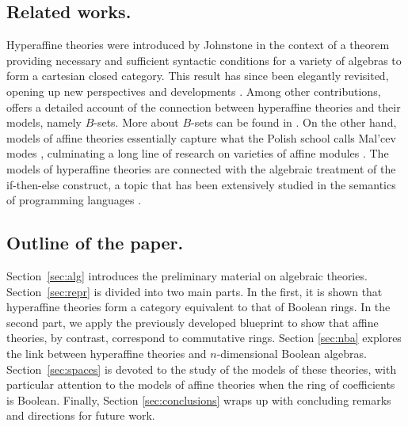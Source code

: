 \documentclass{amsart}
\numberwithin{equation}{section}
\theoremstyle{plain}
\theoremstyle{definition}
\begin{document}
\subsection{Related works.}
Hyperaffine theories were introduced by Johnstone \cite{J90} in the context of a theorem providing necessary and sufficient syntactic conditions for a variety of algebras to form a cartesian closed category.
This result has since been elegantly revisited, opening up new perspectives and developments \cite{G24,G25}.
Among other contributions, \cite{G24} offers a detailed account of the connection between hyperaffine theories and their models, namely $B$-sets.
More about $B$-sets can be found in \cite{S98a,S98b}.
On the other hand, models of affine theories essentially capture what the Polish school calls Mal'cev modes \cite{RS02},
culminating a long line of research on varieties of affine modules \cite{SO66,C75,S77,PRS95}.
The models of hyperaffine theories are connected with the algebraic treatment of the if-then-else construct, a topic that has been extensively studied in the semantics of programming languages \cite{M90,M92,M93,JS09}. 

\subsection{Outline of the paper.}
Section~\ref{sec:alg} introduces the preliminary material on algebraic theories.
Section~\ref{sec:repr} is divided into two main parts.
In the first, it is shown that hyperaffine theories form a category equivalent to that of Boolean rings.
In the second part, we apply the previously developed blueprint to show that affine theories, by contrast, correspond to commutative rings.
Section \ref{sec:nba} explores the link between hyperaffine theories and $n$-dimensional Boolean algebras.
Section~\ref{sec:spaces} is devoted to the study of the models of these theories, with particular attention to the models of affine theories when the ring of coefficients is Boolean.
Finally, Section \ref{sec:conclusions} wraps up with concluding remarks and directions for future work.
\end{document}
